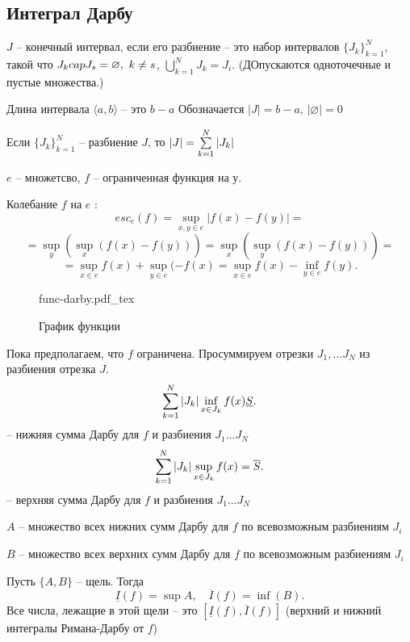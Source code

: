 \documentclass[11pt]{book}
\newcommand{\incfig}[1]{%
    \def\svgwidth{\columnwidth}
    {#1.pdf_tex}
}
\begin{document}
\subsection{Интеграл Дарбу}
\begin{defn}
    $ J$ -- конечный интервал, если его разбиение -- это набор  интервалов $ \{J_k\}^{N}_{k=1}$, такой что $ J_k \\cap  J_s = \varnothing, ~k \ne s $,
    $ \bigcup_{k=1}^{{N}} J_k = J_i $. (ДОпускаются одноточечные и пустые множества.)

\end{defn}
\begin{defn}
    Длина интервала $ \langle a, b \rangle$ -- это $ b - a$
    Обозначается $ |J| = b-a$, $ |\varnothing| = 0$
\end{defn}
\begin{lm}
    Если $ \{J_k\}_{k= 1}^{N}$ -- разбиение $ J$, то $|J| = \sum\limits_{k=1}^{N}  |J_k|$
\end{lm}
\begin{defn}
    $ e$ -- множетсво, $ f$ -- ограниченная функция на $ у$.

    Колебание $ f$ на $  e$ :
    \[
	esc_e (f) = \sup_{x, y \in  e} |f(x) - f(y)|=
    \]
    \[
	=	\sup_{y} \left( \sup_x (f(x) - f(y)) \right)  = \sup_x \left( \sup_y (f(x) - f(y))  \right) =
    \]
    \[
	=\sup_{x \in  e}  f(x)  + \sup_{y \in  e}(-f(x) = \sup _{x \in  e} f(x) - \inf_{y \in  e} f(y)
    .\]
\end{defn}
\begin{figure}[ht]
    \centering
    \incfig{func-darby}
    \caption{График функции}
    \label{fig:func-darby}
\end{figure}
Пока предполагаем, что $ f$ ограничена.
Просуммируем отрезки $ J_1, \ldots J_N $ из разбиения отрезка $ J$.
\[
    \sum\limits_{k= 1}^{N} |J_k|\inf_{x \in  J_k} f(x) \underline{S}
.\] -- нижняя сумма Дарбу  для $ f$ и разбиения $ J_1 \ldots  J_N$
\[
    \sum\limits_{k= 1}^{N} |J_k|\sup_{x \in  J_k} f(x) =\overline{S}
.\] -- верхняя сумма Дарбу  для $ f$ и разбиения $ J_1 \ldots  J_N$
\begin{name}
    $ A$ -- множество всех нижних сумм Дарбу для $ f$ по всевозможным разбиениям $ J_i$

    $ B$ -- множество всех верхних сумм Дарбу для $ f$ по всевозможным разбиениям $ J_i$
\end{name}
\begin{st}
    Пусть $ \{A, B\}$ -- щель. Тогда
    \[
	\underline{I}(f) = \sup{ A} , \quad \overline{I}(f) = \inf(B)
    .\]
    Все числа, лежащие в этой щели -- это $ [ \underline{I} (f) , \overline{I}(f)]$ (верхний и нижний интегралы Римана-Дарбу от $ f$)
\end{st}
\end{document}
